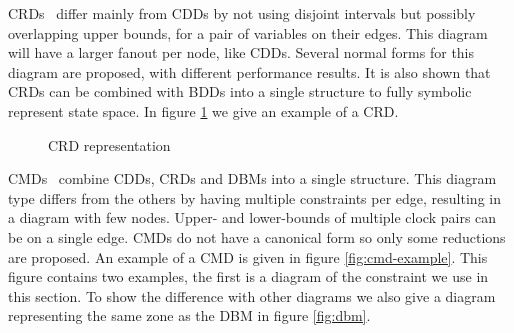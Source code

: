 CRDs~\cite{crds} differ mainly from CDDs by not using disjoint intervals but possibly overlapping upper bounds, for a pair of variables on their edges. This diagram will have a larger fanout per node, like CDDs. Several normal forms for this diagram are proposed, with different performance results. It is also shown that CRDs can be combined with BDDs into a single structure to fully symbolic represent state space. In figure \ref{fig:crd-example} we give an example of a CRD.

\begin{figure}[h]
\begin{center}
\end{center}
\caption{CRD representation}
\label{fig:crd-example}
\end{figure}

CMDs~\cite{5702245} combine CDDs, CRDs and DBMs into a single structure. This diagram type differs from the others by having multiple constraints per edge, resulting in a diagram with few nodes. Upper- and lower-bounds of multiple clock pairs can be on a single edge. CMDs do not have a canonical form so only some reductions are proposed. An example of a CMD is given in figure \ref{fig:cmd-example}. This figure contains two examples, the first is a diagram of the constraint we use in this section. To show the difference with other diagrams we also give a diagram representing the same zone as the DBM in figure \ref{fig:dbm}.

